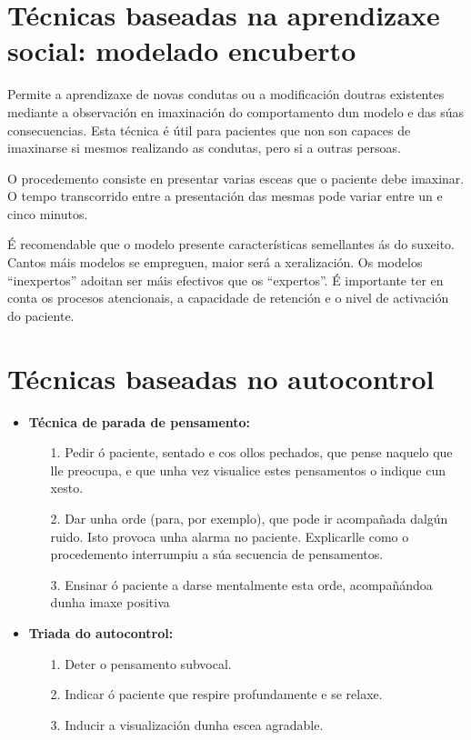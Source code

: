 \documentclass[a4paper,11pt]{article}
\begin{document}
\section{Técnicas baseadas na aprendizaxe social: modelado encuberto}
Permite a aprendizaxe de novas condutas ou a modificación doutras existentes mediante a observación en imaxinación do comportamento dun modelo e das súas consecuencias. Esta técnica é útil para pacientes que non son capaces de imaxinarse si mesmos realizando as condutas, pero si a outras persoas. 

O procedemento consiste en presentar varias esceas que o paciente debe imaxinar. O tempo transcorrido entre a presentación das mesmas pode variar entre un e cinco minutos.

É recomendable que o modelo presente características semellantes ás do suxeito. Cantos máis modelos se empreguen, maior será a xeralización. Os modelos ``inexpertos'' adoitan ser máis efectivos que os ``expertos''. É importante ter en conta os procesos atencionais, a capacidade de retención e o nivel de activación do paciente.

\section{Técnicas baseadas no autocontrol}
\begin{itemize}
	\item \textbf{Técnica de parada de pensamento:}
	\begin{itemize}
		\item[1.] Pedir ó paciente, sentado e cos ollos pechados, que pense naquelo que lle preocupa, 
		e que unha vez visualice estes pensamentos o indique cun xesto.
		\item[2.] Dar unha orde (para, por exemplo), que pode ir acompañada dalgún ruido. Isto 
		provoca unha alarma no paciente. Explicarlle como o procedemento interrumpiu a súa secuencia 
		de pensamentos.
		\item[3.] Ensinar ó paciente a darse mentalmente esta orde, acompañándoa dunha imaxe positiva 
	\end{itemize}
	\item \textbf{Triada do autocontrol:} 
	\begin{itemize}
		\item[1.] Deter o pensamento subvocal.
		\item[2.] Indicar ó paciente que respire profundamente e se relaxe.
		\item[3.] Inducir a visualización dunha escea agradable.
	\end{itemize}
\end{itemize}
\end{document}
